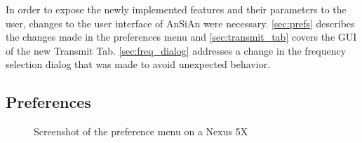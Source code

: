 In order to expose the newly implemented features and their parameters to the user, changes to the user interface of \ac{AnSiAn} were necessary. \autoref{sec:prefs} describes the changes made in the preferences menu and \autoref{sec:transmit_tab} covers the \ac{GUI} of the new Transmit Tab. \autoref{sec:freq_dialog} addresses a change in the frequency selection dialog that was made to avoid unexpected behavior.


\subsection{Preferences\label{sec:prefs}}

\begin{figure}
\centering
{}
\hfill\null
{}
\caption{Screenshot of the preference menu on a Nexus 5X}
\label{fig:demod_prefs}
\end{figure}

